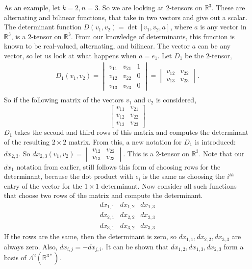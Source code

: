 \documentclass{article}
\theoremstyle{definition}
\theoremstyle{named}
\begin{document}
As an example, let $k=2, n=3$. So we are looking at $2$-tensors on $\mathbb{R}^3$. These are alternating and bilinear functions, that take in two vectors and give out a scalar. The determinant function $D(v_1, v_2) = \det[v_1, v_2, a]$, where $a$ is any vector in $\mathbb{R}^3$, is a $2$-tensor on $\mathbb{R}^3$. From our knowledge of determinants, this function is known to be real-valued, alternating, and bilinear. The vector $a$ can be any vector, so let us look at what happens when $a = e_1$. Let $D_1$ be the $2$-tensor,
\begin{align*}
    D_1(v_1, v_2) = \begin{vmatrix}
        v_{11} & v_{21} & 1\\
        v_{12} & v_{22} & 0\\
        v_{13} & v_{23} & 0
    \end{vmatrix} = \begin{vmatrix}
        v_{12} & v_{22}\\
        v_{13} & v_{23}
    \end{vmatrix}.\\
\end{align*}
So if the following matrix of the vectors $v_1$ and $v_2$ is considered, 
\[
    \begin{bmatrix}
        v_{11} & v_{21}\\
        v_{12} & v_{22}\\
        v_{13} & v_{23}
    \end{bmatrix}
\]
$D_1$ takes the second and third rows of this matrix and computes the determinant of the resulting $2\times2$ matrix. From this, a new notation for $D_1$ is introduced: $dx_{2,3}$. So $dx_{2,3}(v_1, v_2) = \begin{vmatrix}
    v_{12} & v_{22}\\
    v_{13} & v_{23}
\end{vmatrix}$. This is a $2$-tensor on $\mathbb{R}^3$. Note that our $dx_1$ notation from earlier, still follows this form of choosing rows for the determinant, because the dot product with $e_i$ is the same as choosing the $i^{th}$ entry of the vector for the $1\times 1$ determinant. 
Now consider all such functions that choose two rows of the matrix and compute the determinant.
\[
\begin{array}{ccc}
    dx_{1,1} & dx_{1,2} & dx_{1,3}\\
    dx_{2,1} & dx_{2,2} & dx_{2,3}\\
    dx_{3,1} & dx_{3,2} & dx_{3,3}
\end{array}
\]
If the rows are the same, then the determinant is zero, so $dx_{1,1}, dx_{2,2}, dx_{3,3}$ are always zero. Also, $dx_{i,j} = -dx_{j,i}$. It can be shown that $dx_{1,2}, dx_{1,3}, dx_{2,3}$ form a basis of $\Lambda^2(\mathbb{R}^{3*})$. 
\end{document}
